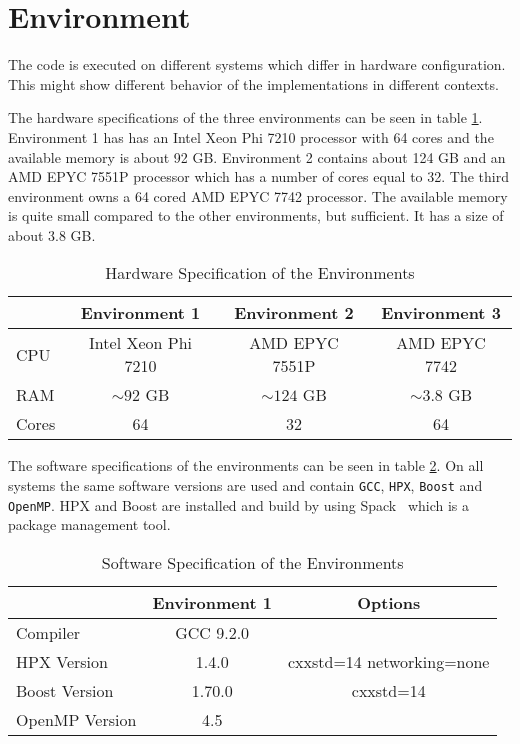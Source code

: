 \section{Environment}
  The code is executed on different systems which differ in hardware configuration.
  This might show different behavior of the implementations in different contexts.

The hardware specifications of the three environments can be seen in table \ref{tab:hardEnv}.
Environment 1 has has an Intel Xeon Phi 7210 processor with 64 cores and the available memory is about 92 GB.
Environment 2 contains about 124 GB and an AMD EPYC 7551P processor which has a number of cores equal to 32.
The third environment owns a 64 cored AMD EPYC 7742 processor. The available memory is quite small compared to the other environments, but sufficient.
It has a size of about 3.8 GB.
\begin{table}
\centering
\caption{Hardware Specification of the Environments}
\begin{tabular}[h]{l c c c}
 & Environment 1 & Environment 2 & Environment 3  \\\hline
CPU & Intel Xeon Phi 7210 & AMD EPYC 7551P & AMD EPYC 7742 \\
RAM & $\sim 92$ GB & $\sim 124$ GB & $\sim 3.8$ GB \\
Cores & 64 & 32 & 64 \\\hline
\end{tabular}
\label{tab:hardEnv}
\end{table}

The software specifications of the environments can be seen in table \ref{tab:softEnv}.
On all systems the same software versions are used and contain \texttt{GCC}, \texttt{HPX}, \texttt{Boost} and \texttt{OpenMP}.
HPX and Boost are installed and build by using Spack~\cite{Spack.2020} which is a package management tool.
\begin{table}
\centering
\caption{Software Specification of the Environments}
\begin{tabular}[h]{l c c}
\centering
 & Environment 1 & Options\\\hline
Compiler & GCC 9.2.0 & \\
HPX Version & 1.4.0 & cxxstd=14 networking=none  \\
Boost Version & 1.70.0 & cxxstd=14 \\
OpenMP Version & 4.5 & \\\hline
\end{tabular}
\label{tab:softEnv}
\end{table}